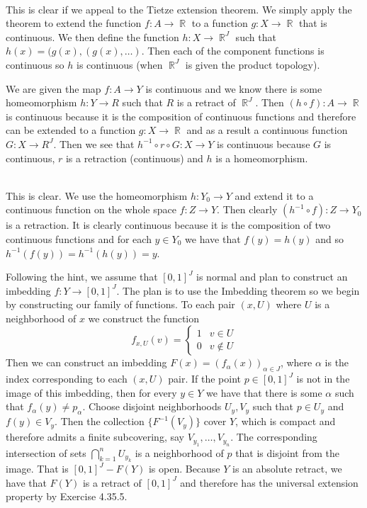 \documentclass{article}
\DeclareMathOperator{\R}{\mathbb{R}}
\newcommand{\problem}[1]{\noindent{\textbf{Problem #1}}\\}
\newcommand{\problempart}[1]{\noindent{\textbf{(#1)}}}
\begin{document}
\problem{4.35.5}
\problempart{a} This is clear if we appeal to the Tietze extension theorem. We simply apply the theorem to extend the function $f: A \to \R$ to a function $g: X \to \R$ that is continuous. We then define the function $h: X \to \R^J$ such that $h(x) = (g(x), (g(x), \ldots)$. Then each of the component functions is continuous so $h$ is continuous (when $\R^J$ is given the product topology). 

\problempart{b} We are given the map $f: A \to Y$ is continuous and we know there is some homeomorphism $h: Y \to R$ such that $R$ is a retract of $\R^J$. Then $(h \circ f): A \to \R$ is continuous because it is the composition of continuous functions and therefore can be extended to a function $g: X \to \R$ and as a result a continuous function $G: X \to R^J$. Then we see that $h^{-1}\circ r \circ G: X \to Y$ is continuous because $G$ is continuous, $r$ is a retraction (continuous) and $h$ is a homeomorphism.  

\problem{4.35.6}
\problempart{a} This is clear. We use the homeomorphism $h: Y_0 \to Y$ and extend it to a continuous function on the whole space $f:Z \to Y$. Then clearly $(h^{-1} \circ f): Z \to Y_0$ is a retraction. It is clearly continuous because it is the composition of two continuous functions and for each $y \in Y_0$ we have that  $f(y) = h(y)$ and so $h^{-1}(f(y)) = h^{-1}(h(y)) = y$. 

\problempart{b} Following the hint, we assume that $[0,1]^J$ is normal and plan to construct an imbedding $f: Y \to [0,1]^J$. The plan is to use the Imbedding theorem so we  begin by constructing our family of functions. To each pair $(x, U)$ where $U$ is a neighborhood of $x$ we construct the function
\[
f_{x,U}(v) = \begin{cases}
1 & v \in U \\
0 & v \not\in U
\end{cases}
\]
Then we can construct an imbedding $F(x) = (f_\alpha(x))_{\alpha \in J}$, where $\alpha$ is the index corresponding to each $(x,U)$ pair. If the point $p \in [0,1]^J$ is not in the image of this imbedding, then for every $y \in Y$ we have that there is some $\alpha$ such that $f_\alpha(y) \neq p_\alpha$. Choose disjoint neighborhoods $U_y, V_y$ such that $p \in U_y$ and $f(y) \in V_y$. Then the collection $\{F^{-1}(V_y)\}$ cover $Y$, which is compact and therefore admits a finite subcovering, say $V_{y_1},\ldots, V_{y_n}$. The corresponding intersection of sets $\bigcap_{k=1}^n U_{y_k}$ is a neighborhood of $p$ that is disjoint from the image. That is $[0,1]^J - F(Y)$ is open. Because $Y$ is an absolute retract, we have that $F(Y)$ is a retract of $[0,1]^J$ and therefore has the universal extension property by Exercise 4.35.5.  
\end{document}
